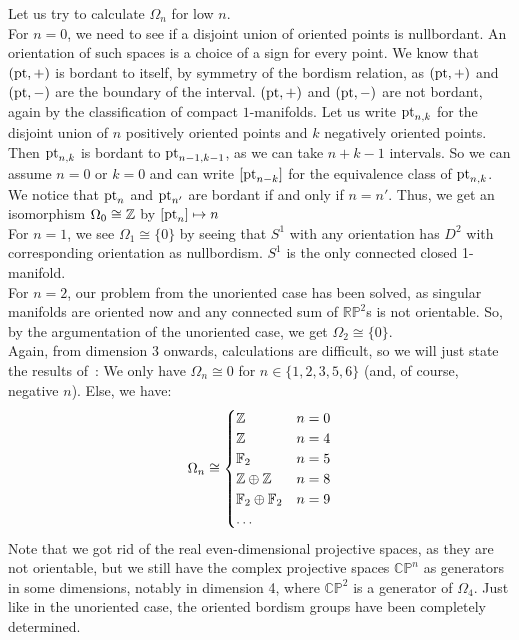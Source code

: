 \documentclass[a4paper,12pt]{article}
\begin{document}
Let us try to calculate \(\Omega_n\) for low \(n\).\\
For \(n=0\), we need to see if a disjoint union of oriented points is nullbordant. 
An orientation of such spaces is a choice of a sign for every point. 
We know that \((\mathrm{pt},+)\) is bordant to itself, by symmetry of the bordism relation, as \((\mathrm{pt},+)\) and \((\mathrm{pt},-)\) are the boundary of the interval. \((\mathrm{pt},+)\) and \((\mathrm{pt},-)\) are not bordant, again by the classification of compact \(1\)-manifolds.
Let us write \(\mathrm{pt}_{n,k}\) for the disjoint union of \(n\) positively oriented points and \(k\) negatively oriented points. 
Then \(\mathrm{pt}_{n,k}\) is bordant to \(\mathrm{pt}_{n-1,k-1}\), as we can take \(n+k-1\) intervals. So we can assume \(n=0\) or \(k=0\) and can write \([\mathrm{pt}_{n-k}]\) for the equivalence class of \(\mathrm{pt}_{n,k}\). We notice that \(\mathrm{pt}_n\) and \(\mathrm{pt}_{n'}\) are bordant if and only if \(n=n'\). 
Thus, we get an isomorphism \(\Omega_0\cong\mathbb{Z}\) by \([\mathrm{pt}_n]\mapsto n\)\\
For \(n=1\), we see \(\Omega_1\cong\{0\}\) by seeing that \(S^1\) with any orientation has \(D^2\) with corresponding orientation as nullbordism. \(S^1\) is the only connected closed 1-manifold.\\
For \(n=2\), our problem from the unoriented case has been solved, as singular manifolds are oriented now and any connected sum of \(\mathbb{RP}^2\)s is not orientable. 
So, by the argumentation of the unoriented case, we get \(\Omega_2\cong\{0\}\).\\
Again, from dimension 3 onwards, calculations are difficult, so we will just state the results of\ \cite[\S 17]{stasheff}: We only have \(\Omega_n\cong 0\) for \(n\in\{1,2,3,5,6\}\) (and, of course, negative \(n\)). Else, we have:
\[\Omega_n\cong\begin{cases}\mathbb{Z} & n=0\\
\mathbb{Z} & n=4\\
\mathbb{F}_2 & n=5\\
\mathbb{Z}\oplus\mathbb{Z} & n=8\\
\mathbb{F}_2\oplus\mathbb{F}_2 & n=9\\
\dots
\end{cases}\]
Note that we got rid of the real even-dimensional projective spaces, as they are not orientable, but we still have the complex projective spaces \(\mathbb{CP}^n\) as generators in some dimensions, notably in dimension 4, where \(\mathbb{CP}^2\) is a generator of \(\Omega_4\).
Just like in the unoriented case, the oriented bordism groups have been completely determined.
\end{document}
